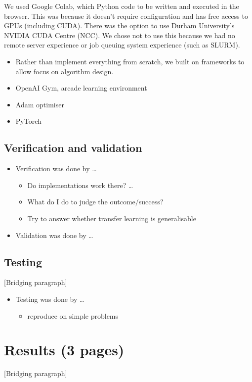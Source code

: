 \documentclass[12pt,a4paper]{article}
\begin{document}
We used Google Colab, which Python code to be written and executed in the browser. This was because it doesn't require configuration and has free access to GPUs (including CUDA). There was the option to use Durham University's NVIDIA CUDA Centre (NCC). We chose not to use this because we had no remote server experience or job queuing system experience (such as SLURM).

\begin{itemize}
    \item Rather than implement everything from scratch, we built on frameworks to allow focus on algorithm design.
    \item OpenAI Gym, arcade learning environment
    \item Adam optimiser
    \item PyTorch
\end{itemize}

\subsection{Verification and validation}
\begin{itemize}
    \item Verification was done by \dots 
    \begin{itemize}
        \item Do implementations work there? \dots 
        \item What do I do to judge the outcome/success?
        \item Try to answer whether transfer learning is generalisable 
    \end{itemize}
    \item Validation was done by \dots
\end{itemize}

\subsection{Testing}
[Bridging paragraph]
\begin{itemize}
    \item Testing was done by \dots
    \begin{itemize}
        \item reproduce on simple problems
    \end{itemize}
\end{itemize}

\newpage
\section{Results (3 pages)}
[Bridging paragraph]
\end{document}
